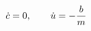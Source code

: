 \documentclass[preview]{standalone}
\begin{document}
\begin{align*}
\special{dvisvgm:raw <g id='unique000'>}\dot c = 0,\qquad \dot u = -\frac bm\special{dvisvgm:raw </g>}
\end{align*}
\end{document}
